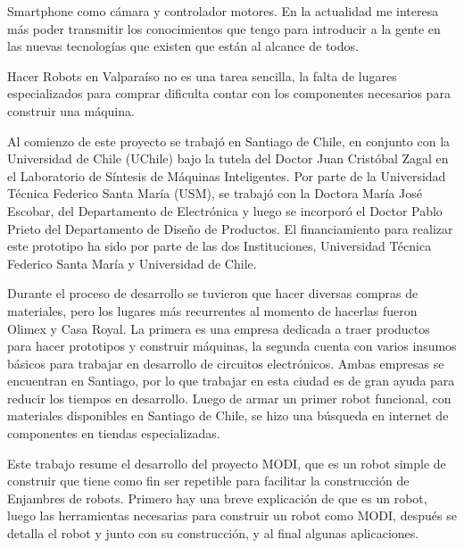 Smartphone como cámara y controlador motores. En la actualidad me interesa más poder transmitir los conocimientos que tengo para introducir a la gente en las nuevas tecnologías que existen que están al alcance de todos.

Hacer Robots en Valparaíso no es una tarea sencilla, la falta de lugares especializados para comprar dificulta contar con los componentes necesarios para construir una máquina.

Al comienzo de este proyecto se trabajó en Santiago de Chile, en conjunto con la Universidad de Chile (UChile) bajo la tutela del Doctor Juan Cristóbal Zagal en el Laboratorio de Síntesis de Máquinas Inteligentes. Por parte de la Universidad Técnica Federico Santa María (USM), se trabajó con la Doctora María José Escobar, del Departamento de Electrónica y luego se incorporó el Doctor Pablo Prieto del Departamento de Diseño de Productos. El financiamiento para realizar este prototipo ha sido por parte de las dos Instituciones, Universidad Técnica Federico Santa María y Universidad de Chile.

Durante el proceso de desarrollo se tuvieron que hacer diversas compras de materiales, pero los lugares más recurrentes al momento de hacerlas fueron Olimex y Casa Royal. La primera es una empresa dedicada a traer productos para hacer prototipos y construir máquinas, la segunda cuenta con varios insumos básicos para trabajar en desarrollo de circuitos electrónicos. Ambas empresas se encuentran en Santiago, por lo que trabajar en esta ciudad es de gran ayuda para reducir los tiempos en desarrollo.
Luego de armar un primer robot funcional, con materiales disponibles en Santiago de Chile, se hizo una búsqueda en internet de componentes en tiendas especializadas.

Este trabajo resume el desarrollo del proyecto MODI, que es un robot simple de construir que tiene como fin ser repetible para facilitar la construcción de Enjambres de robots. Primero hay una breve explicación de que es un robot, luego las herramientas necesarias para construir un robot como MODI, después se detalla el robot y junto con su construcción, y al final algunas aplicaciones.




